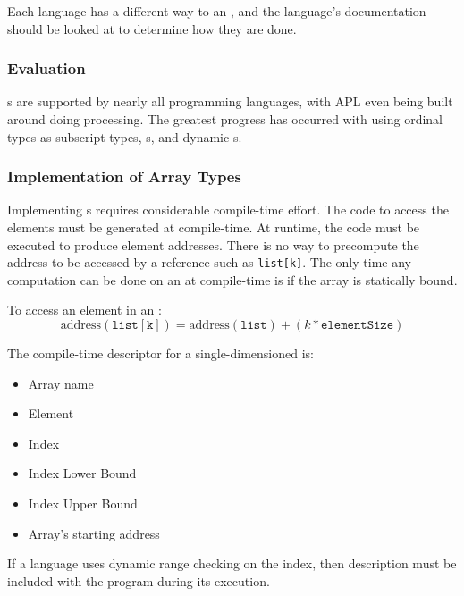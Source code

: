Each language has a different way to  an , and the language's documentation should be looked at to determine how they are done.

\subsubsection{Evaluation}\label{subsubsec:Arrays-Evaluation}
s are supported by nearly all programming languages, with APL even being built around doing  processing.
The greatest progress has occurred with using ordinal types as subscript types, s, and dynamic s.

\subsubsection{Implementation of Array Types}\label{subsubsec:Arrays-Implementation}
Implementing s requires considerable compile-time effort.
The code to access the elements must be generated at compile-time.
At runtime, the code must be executed to produce element addresses.
There is no way to precompute the address to be accessed by a reference such as \texttt{list[k]}.
The only time any computation can be done on an  at compile-time is if the array is statically bound.

To access an element in an :
\begin{equation}\label{eq:Access_Array_Element}
  \text{address}(\mathtt{list[k]}) = \text{address}(\mathtt{list}) + (k * \mathtt{elementSize})
\end{equation}

The compile-time descriptor for a single-dimensioned  is:
\begin{itemize}[noitemsep]
\item Array name
\item Element 
\item Index 
\item Index Lower Bound
\item Index Upper Bound
\item Array's starting address
\end{itemize}

If a language uses dynamic range checking on the index, then description must be included with the program during its execution.


